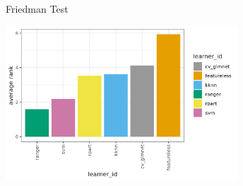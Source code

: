 \documentclass[11pt,compress,t,notes=noshow, xcolor=table]{beamer}
\begin{document}
\begin{frame}{Friedman Test}

{
    \tiny
    
}
    \centering
    \includegraphics[width = 0.65\textwidth]{figure/benchmarkrankplot.png}

\end{frame}





\end{document}
